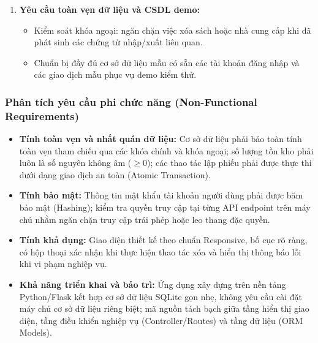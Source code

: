 \documentclass[12pt,a4paper]{article}
\begin{document}
\begin{enumerate}
\begin{itemize}
        \item Kết xuất phiếu nhập kho thành tệp văn bản PDF chuẩn để in ấn và lưu trữ.
    \end{itemize}
    \item \textbf{Yêu cầu toàn vẹn dữ liệu và CSDL demo:}
    \begin{itemize}
        \item Kiểm soát khóa ngoại: ngăn chặn việc xóa sách hoặc nhà cung cấp khi đã phát sinh các chứng từ nhập/xuất liên quan.
        \item Chuẩn bị đầy đủ cơ sở dữ liệu mẫu có sẵn các tài khoản đăng nhập và các giao dịch mẫu phục vụ demo kiểm thử.
    \end{itemize}
\end{enumerate}

\subsubsection{Phân tích yêu cầu phi chức năng (Non-Functional Requirements)}
\begin{itemize}
    \item \textbf{Tính toàn vẹn và nhất quán dữ liệu:} Cơ sở dữ liệu phải bảo toàn tính toàn vẹn tham chiếu qua các khóa chính và khóa ngoại; số lượng tồn kho phải luôn là số nguyên không âm ($\ge 0$); các thao tác lập phiếu phải được thực thi dưới dạng giao dịch an toàn (Atomic Transaction).
    \item \textbf{Tính bảo mật:} Thông tin mật khẩu tài khoản người dùng phải được băm bảo mật (Hashing); kiểm tra quyền truy cập tại từng API endpoint trên máy chủ nhằm ngăn chặn truy cập trái phép hoặc leo thang đặc quyền.
    \item \textbf{Tính khả dụng:} Giao diện thiết kế theo chuẩn Responsive, bố cục rõ ràng, có hộp thoại xác nhận khi thực hiện thao tác xóa và hiển thị thông báo lỗi khi vi phạm nghiệp vụ.
    \item \textbf{Khả năng triển khai và bảo trì:} Ứng dụng xây dựng trên nền tảng Python/Flask kết hợp cơ sở dữ liệu SQLite gọn nhẹ, không yêu cầu cài đặt máy chủ cơ sở dữ liệu riêng biệt; mã nguồn tách bạch giữa tầng hiển thị giao diện, tầng điều khiển nghiệp vụ (Controller/Routes) và tầng dữ liệu (ORM Models).
\end{itemize}

\newpage
\end{document}
